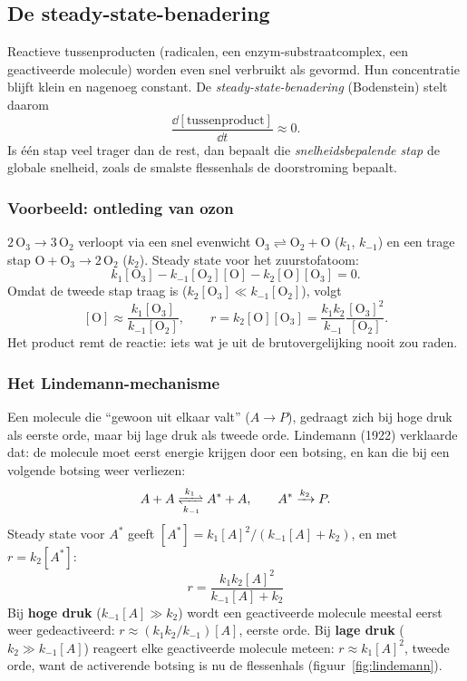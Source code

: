 \subsection{De steady-state-benadering}
\label{sec:steady-state}

Reactieve tussenproducten (radicalen, een enzym-substraatcomplex, een geactiveerde molecule) worden even snel verbruikt als gevormd. Hun concentratie blijft klein en nagenoeg constant. De \emph{steady-state-benadering} (Bodenstein) stelt daarom
\begin{equation}
\frac{\dd{[\text{tussenproduct}]}}{\dd{t}} \approx 0 .
\end{equation}
Is \'e\'en stap veel trager dan de rest, dan bepaalt die \emph{snelheidsbepalende stap} de globale snelheid, zoals de smalste flessenhals de doorstroming bepaalt.

\subsubsection{Voorbeeld: ontleding van ozon}
\label{sec:ozon}

$\mathrm{2\,O_3 \rightarrow 3\,O_2}$ verloopt via een snel evenwicht $\mathrm{O_3} \rightleftharpoons \mathrm{O_2 + O}$ ($k_1$, $k_{-1}$) en een trage stap $\mathrm{O + O_3} \rightarrow 2\,\mathrm{O_2}$ ($k_2$). Steady state voor het zuurstofatoom:
\[
k_1[\mathrm{O_3}] - k_{-1}[\mathrm{O_2}][\mathrm{O}] - k_2[\mathrm{O}][\mathrm{O_3}] = 0 .
\]
Omdat de tweede stap traag is ($k_2[\mathrm{O_3}] \ll k_{-1}[\mathrm{O_2}]$), volgt
\[
[\mathrm{O}] \approx \frac{k_1[\mathrm{O_3}]}{k_{-1}[\mathrm{O_2}]},
\qquad
r = k_2[\mathrm{O}][\mathrm{O_3}] = \frac{k_1 k_2}{k_{-1}} \frac{[\mathrm{O_3}]^2}{[\mathrm{O_2}]}.
\]
Het product  remt de reactie: iets wat je uit de brutovergelijking nooit zou raden.

\subsubsection{Het Lindemann-mechanisme}
\label{sec:lindemann}

Een molecule die ``gewoon uit elkaar valt'' ($A \to P$), gedraagt zich bij hoge druk als eerste orde, maar bij lage druk als tweede orde. Lindemann (1922) verklaarde dat: de molecule moet eerst energie krijgen door een botsing, en kan die bij een volgende botsing weer verliezen:
\[
A + A \xrightleftharpoons[k_{-1}]{k_1} A^* + A, \qquad A^* \xrightarrow{k_2} P .
\]
Steady state voor $A^*$ geeft $[A^*] = k_1[A]^2/(k_{-1}[A]+k_2)$, en met $r = k_2[A^*]$:
\begin{equation}
\boxed{\;r = \frac{k_1k_2[A]^2}{k_{-1}[A]+k_2}\;}
\label{eq:lindemann}
\end{equation}
Bij \textbf{hoge druk} ($k_{-1}[A] \gg k_2$) wordt een geactiveerde molecule meestal eerst weer gedeactiveerd: $r \approx (k_1k_2/k_{-1})[A]$, eerste orde. Bij \textbf{lage druk} ($k_2 \gg k_{-1}[A]$) reageert elke geactiveerde molecule meteen: $r \approx k_1[A]^2$, tweede orde, want de activerende botsing is nu de flessenhals (figuur~\ref{fig:lindemann}).

